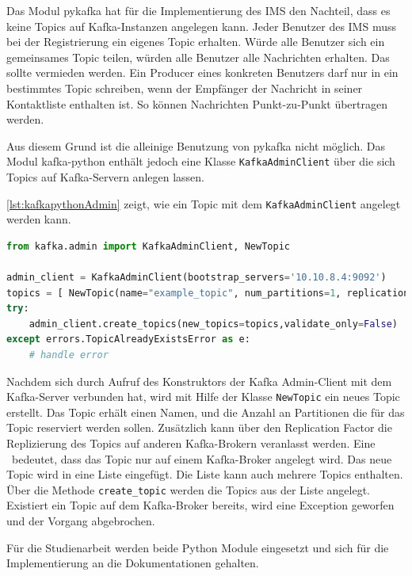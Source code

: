 \documentclass[a4paper,titlepage,halfparskip,12pt]{scrreprt}
\begin{document}
\begin{onehalfspacing}
Das Modul pykafka hat für die Implementierung des \acs{IMS} den Nachteil, dass es keine Topics auf Kafka-Instanzen angelegen kann. Jeder Benutzer des \acs{IMS} muss bei der Registrierung ein eigenes Topic erhalten. Würde alle Benutzer sich ein gemeinsames Topic teilen, würden alle Benutzer alle Nachrichten erhalten. Das sollte vermieden werden. Ein Producer eines konkreten Benutzers darf nur in ein bestimmtes Topic schreiben, wenn der Empfänger der Nachricht in seiner Kontaktliste enthalten ist. So können Nachrichten Punkt-zu-Punkt übertragen werden.

Aus diesem Grund ist die alleinige Benutzung von pykafka nicht möglich. Das Modul kafka-python enthält jedoch eine Klasse \texttt{KafkaAdminClient} über die sich Topics auf Kafka-Servern anlegen lassen. 

\pagebreak

\autoref{lst:kafkapythonAdmin} zeigt, wie ein Topic mit dem \texttt{KafkaAdminClient} angelegt werden kann.

\begin{lstlisting}[language=python, caption={Beispiel: Anlegen eines Topics mit dem KafkaAdminClient des Moduls kafka-python}, label={lst:kafkapythonAdmin}]
from kafka.admin import KafkaAdminClient, NewTopic

admin_client = KafkaAdminClient(bootstrap_servers='10.10.8.4:9092')
topics = [ NewTopic(name="example_topic", num_partitions=1, replication_factor=1) ]
try:
    admin_client.create_topics(new_topics=topics,validate_only=False)
except errors.TopicAlreadyExistsError as e:
    # handle error

\end{lstlisting}

Nachdem sich durch Aufruf des Konstruktors der Kafka Admin-Client mit dem Kafka-Server verbunden hat, wird mit Hilfe der Klasse \texttt{NewTopic} ein neues Topic erstellt. Das Topic erhält einen Namen, und die Anzahl an Partitionen die für das Topic reserviert werden sollen. Zusätzlich kann über den Replication Factor die Replizierung des Topics auf anderen Kafka-Brokern veranlasst werden. Eine \grqq\ bedeutet, dass das Topic nur auf einem Kafka-Broker angelegt wird. Das neue Topic wird in eine Liste eingefügt. Die Liste kann auch mehrere Topics enthalten. Über die Methode \texttt{create\_topic} werden die Topics aus der Liste angelegt. Existiert ein Topic auf dem Kafka-Broker bereits, wird eine Exception geworfen und der Vorgang abgebrochen.

Für die Studienarbeit werden beide Python Module eingesetzt und sich für die Implementierung an die Dokumentationen \cite{pykafkaDocumentation, pythonKafka} gehalten.


\end{onehalfspacing}
\end{document}
